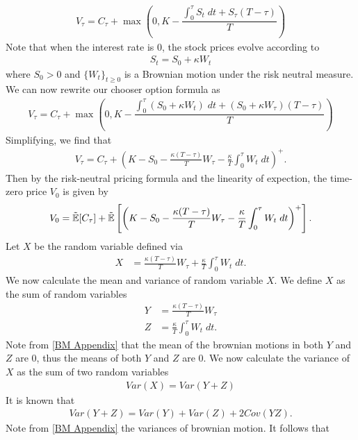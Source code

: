 \documentclass[reqno]{amsart}
\begin{document}
\begin{align}
     V_\tau = C_\tau + \max(0, K - \dfrac{\int_0^\tau S_t \; dt + S_\tau (T - \tau)}{T})
\end{align}
Note that when the interest rate is $0$, the stock prices evolve according to 
\begin{align}
     S_t = S_0 + \kappa W_t
\end{align}
where $S_0 > 0$ and $\{W_t\}_{t \ge 0}$ is a Brownian motion under the risk neutral measure. We can now rewrite our chooser option formula as
\begin{align}
     V_\tau = C_\tau + \max(0, K - \dfrac{\int_0^\tau \left( S_0 + \kappa W_t \right) \; dt + (S_0 + \kappa W_\tau) (T - \tau)}{T})
\end{align}
Simplifying, we find that 
\begin{align}
     V_\tau = C_\tau + \left(K- S_0 - \frac{\kappa(T-\tau)}{T} W_\tau - \frac{\kappa}{T} \int_0^\tau W_t \; dt  \right)^+.
\end{align}
Then by the risk-neutral pricing formula and the linearity of expection, the time-zero price $V_0$ is given by
\begin{align} \label{eq: expect form}
     V_0 = \tilde{\mathbb{E}}[C_\tau] + \tilde{\mathbb{E}}\left[\left(K- S_0 - \frac{\kappa(T-\tau)}{T} W_\tau - \frac{\kappa}{T} \int_0^\tau W_t \; dt  \right)^+\right].
\end{align}
Let $X$ be the random variable defined via 
\begin{align}
     X &= \frac{\kappa(T-\tau)}{T} W_\tau + \frac{\kappa}{T} \int_0^\tau W_t \; dt.
\end{align}
We now calculate the mean and variance of random variable $X$. We define $X$ as the sum of random variables
\begin{align}
     Y &= \frac{\kappa(T-\tau)}{T} W_\tau\\
     Z &= \frac{\kappa}{T} \int_0^\tau W_t \; dt.
\end{align}
Note from \eqref{BM Appendix} that the mean of the brownian motions in both $Y$ and $Z$ are $0$, thus the means of both $Y$ and $Z$ are 0. 
We now calculate the variance of $X$ as the sum of two random variables
\begin{align}
     Var(X) = Var(Y + Z)
\end{align}
It is known that
\begin{align}
     Var(Y + Z) = Var(Y) + Var(Z) + 2Cov(YZ).
\end{align}
Note from \eqref{BM Appendix} the variances of brownian motion. It follows that 
\end{document}

